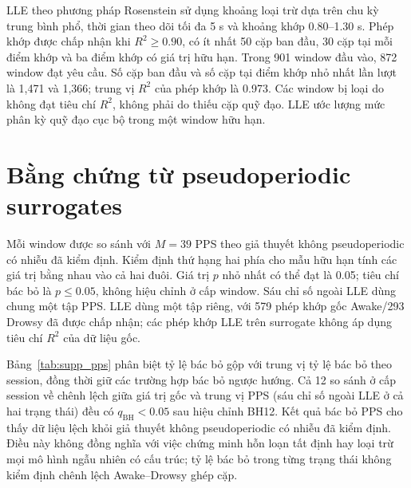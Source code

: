\documentclass[conference,a4paper]{IEEEtran}
\begin{document}
LLE theo phương pháp Rosenstein sử dụng khoảng loại trừ dựa trên chu kỳ trung bình phổ, thời gian theo dõi tối đa 5 s và khoảng khớp 0.80--1.30 s. Phép khớp được chấp nhận khi $R^2\geq0.90$, có ít nhất 50 cặp ban đầu, 30 cặp tại mỗi điểm khớp và ba điểm khớp có giá trị hữu hạn. Trong 901 window đầu vào, 872 window đạt yêu cầu. Số cặp ban đầu và số cặp tại điểm khớp nhỏ nhất lần lượt là 1,471 và 1,366; trung vị $R^2$ của phép khớp là 0.973. Các window bị loại do không đạt tiêu chí $R^2$, không phải do thiếu cặp quỹ đạo. LLE ước lượng mức phân kỳ quỹ đạo cục bộ trong một window hữu hạn.

\section{Bằng chứng từ pseudoperiodic surrogates}\label{sec:supp_5}
Mỗi window được so sánh với $M=39$ PPS theo giả thuyết không pseudoperiodic có nhiễu đã kiểm định. Kiểm định thứ hạng hai phía cho mẫu hữu hạn tính các giá trị bằng nhau vào cả hai đuôi. Giá trị $p$ nhỏ nhất có thể đạt là 0.05; tiêu chí bác bỏ là $p\leq0.05$, không hiệu chỉnh ở cấp window. Sáu chỉ số ngoài LLE dùng chung một tập PPS. LLE dùng một tập riêng, với 579 phép khớp gốc Awake/293 Drowsy đã được chấp nhận; các phép khớp LLE trên surrogate không áp dụng tiêu chí $R^2$ của dữ liệu gốc.

Bảng~\ref{tab:supp_pps} phân biệt tỷ lệ bác bỏ gộp với trung vị tỷ lệ bác bỏ theo session, đồng thời giữ các trường hợp bác bỏ ngược hướng. Cả 12 so sánh ở cấp session về chênh lệch giữa giá trị gốc và trung vị PPS (sáu chỉ số ngoài LLE ở cả hai trạng thái) đều có $q_{\mathrm{BH}}<0.05$ sau hiệu chỉnh BH12. Kết quả bác bỏ PPS cho thấy dữ liệu lệch khỏi giả thuyết không pseudoperiodic có nhiễu đã kiểm định. Điều này không đồng nghĩa với việc chứng minh hỗn loạn tất định hay loại trừ mọi mô hình ngẫu nhiên có cấu trúc; tỷ lệ bác bỏ trong từng trạng thái không kiểm định chênh lệch Awake--Drowsy ghép cặp.
\end{document}
